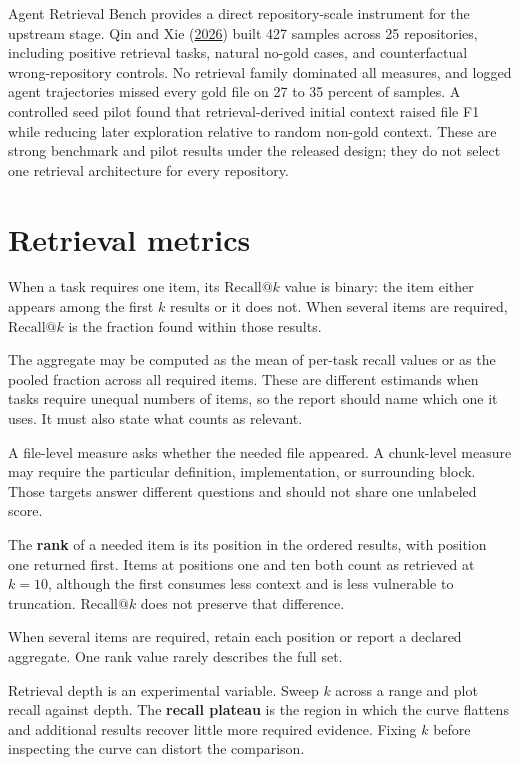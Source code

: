Agent Retrieval Bench provides a direct repository-scale instrument for the upstream stage. Qin and Xie (\href{https://arxiv.org/abs/2607.24882}{2026}) built 427 samples across 25 repositories, including positive retrieval tasks, natural no-gold cases, and counterfactual wrong-repository controls. No retrieval family dominated all measures, and logged agent trajectories missed every gold file on 27 to 35 percent of samples. A controlled seed pilot found that retrieval-derived initial context raised file F1 while reducing later exploration relative to random non-gold context. These are strong benchmark and pilot results under the released design; they do not select one retrieval architecture for every repository.

\hypertarget{retrieval-metrics}{%
\section{Retrieval metrics}\label{retrieval-metrics}}

When a task requires one item, its \(\mathrm{Recall}@k\) value is binary: the item either appears among the first \(k\) results or it does not. When several items are required, \(\mathrm{Recall}@k\) is the fraction found within those results.

The aggregate may be computed as the mean of per-task recall values or as the pooled fraction across all required items. These are different estimands when tasks require unequal numbers of items, so the report should name which one it uses. It must also state what counts as relevant.

A file-level measure asks whether the needed file appeared. A chunk-level measure may require the particular definition, implementation, or surrounding block. Those targets answer different questions and should not share one unlabeled score.

The \textbf{rank} of a needed item is its position in the ordered results, with position one returned first. Items at positions one and ten both count as retrieved at \(k = 10\), although the first consumes less context and is less vulnerable to truncation. \(\mathrm{Recall}@k\) does not preserve that difference.

When several items are required, retain each position or report a declared aggregate. One rank value rarely describes the full set.

Retrieval depth is an experimental variable. Sweep \(k\) across a range and plot recall against depth. The \textbf{recall plateau} is the region in which the curve flattens and additional results recover little more required evidence. Fixing \(k\) before inspecting the curve can distort the comparison.

